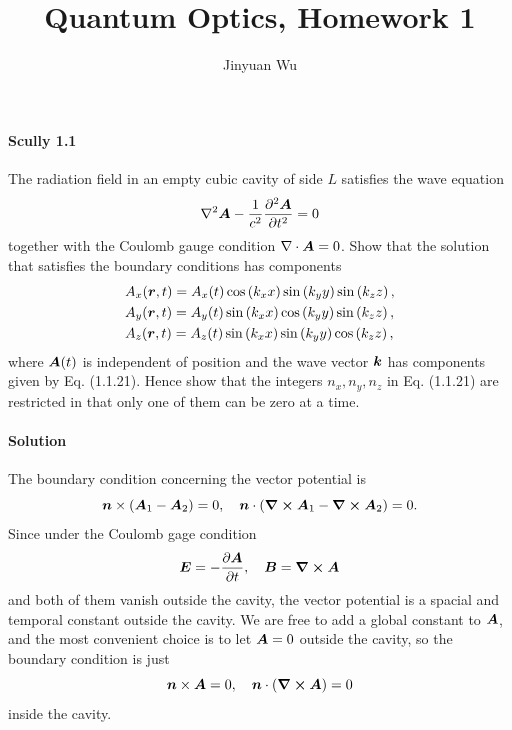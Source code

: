 \documentclass[hyperref, a4paper]{article}
\title{Quantum Optics, Homework 1}
\author{Jinyuan Wu}
\begin{document}
\maketitle

\paragraph{Scully 1.1} The radiation field in an empty cubic cavity of side $L$ satisfies the wave equation
\begin{equation}
    \nabla^{2} \vb*{A}-\frac{1}{c^{2}} \frac{\partial^{2} \vb*{A}}{\partial t^{2}}=0
    \label{eq:scully-1-1-1}
\end{equation}
together with the Coulomb gauge condition $\nabla \cdot \vb*{A}=0$. Show that the solution that satisfies the boundary conditions has components
\begin{equation}
    \begin{aligned}
        &A_{x}(\vb*{r}, t)=A_{x}(t) \cos \left(k_{x} x\right) \sin \left(k_{y} y\right) \sin \left(k_{z} z\right), \\
        &A_{y}(\vb*{r}, t)=A_{y}(t) \sin \left(k_{x} x\right) \cos \left(k_{y} y\right) \sin \left(k_{z} z\right), \\
        &A_{z}(\vb*{r}, t)=A_{z}(t) \sin \left(k_{x} x\right) \sin \left(k_{y} y\right) \cos \left(k_{z} z\right),
        \end{aligned}
    \label{eq:scully-1-1-2}
\end{equation}
where $\vb*{A}(t)$ is independent of position and the wave vector $\vb*{k}$ has components given by Eq. (1.1.21). Hence show that the integers $n_{x}, n_{y}, n_{z}$ in Eq. (1.1.21) are restricted in that only one of them can be zero at a time.

\paragraph{Solution} The boundary condition concerning the vector potential is
\[
    \vb*{n} \times (\vb*{A}_1 - \vb*{A}_2) = 0, \quad \vb*{n} \cdot (\curl{\vb*{A}_1} - \curl{\vb*{A}_2}) = 0.
\]
Since under the Coulomb gage condition
\[
    \vb*{E} = - \pdv{\vb*{A}}{t}, \quad \vb*{B} = \curl{\vb*{A}}
\]
and both of them vanish outside the cavity, the vector potential is a spacial and temporal constant outside the cavity.
We are free to add a global constant to $\vb*{A}$, and the most convenient choice is to let $\vb*{A} = 0$ outside the cavity, so the boundary condition is just
\[
    \vb*{n} \times \vb*{A} = 0, \quad \vb*{n} \cdot (\curl{\vb*{A}}) = 0
\]
inside the cavity.
\end{document}
